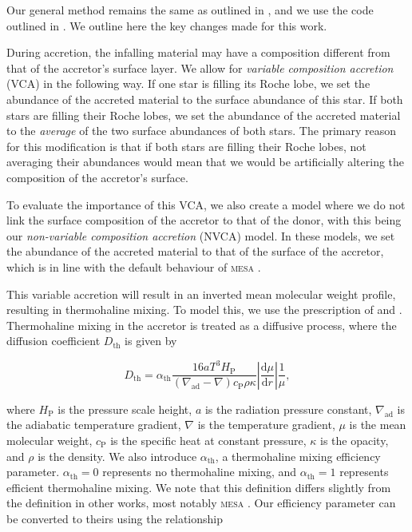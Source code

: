 Our general method remains the same as outlined in , and we use the  code outlined in . We outline here the key changes made for this work.

During accretion, the infalling material may have a composition different from that of the accretor's surface layer. We allow for \textit{variable composition accretion} (VCA) in the following way. If one star is filling its Roche lobe, we set the abundance of the accreted material to the surface abundance of this star. If both stars are filling their Roche lobes, we set the abundance of the accreted material to the \textit{average} of the two surface abundances of both stars. The primary reason for this modification is that if both stars are filling their Roche lobes, not averaging their abundances would mean that we would be artificially altering the composition of the accretor's surface.

To evaluate the importance of this VCA, we also create a model where we do not link the surface composition of the accretor to that of the donor, with this being our \textit{non-variable composition accretion} (NVCA) model. In these models, we set the abundance of the accreted material to that of the surface of the accretor, which is in line with the default behaviour of \textsc{mesa} \citep{Paxton:2015}.

This variable accretion will result in an inverted mean molecular weight profile, resulting in thermohaline mixing. To model this, we use the prescription of \citet{Kippenhahn:1980} and \citet{Stancliffe:2007}. Thermohaline mixing in the accretor is treated as a diffusive process, where the diffusion coefficient $D_\text{th}$ is given by

\begin{equation}
    D_\text{th} = \alpha_\text{th}\frac{16aT^3 H_\text{P}}{\left(\nabla_\text{ad}-\nabla\right)c_\text{P}\rho\kappa}\left|\frac{\mathrm{d}\mu}{\mathrm{d}r}\right|\frac{1}{\mu},
\end{equation}

where $H_\text{P}$ is the pressure scale height, $a$ is the radiation pressure constant, $\nabla_\text{ad}$ is the adiabatic temperature gradient, $\nabla$ is the temperature gradient, $\mu$ is the mean molecular weight, $c_\text{P}$ is the specific heat at constant pressure, $\kappa$ is the opacity, and $\rho$ is the density. We also introduce $\alpha_\text{th}$, a thermohaline mixing efficiency parameter. $\alpha_\text{th}=0$ represents no thermohaline mixing, and $\alpha_\text{th}=1$ represents efficient thermohaline mixing. We note that this definition differs slightly from the definition in other works, most notably \textsc{mesa} \citep{Paxton:2013}. Our efficiency parameter can be converted to theirs using the relationship

